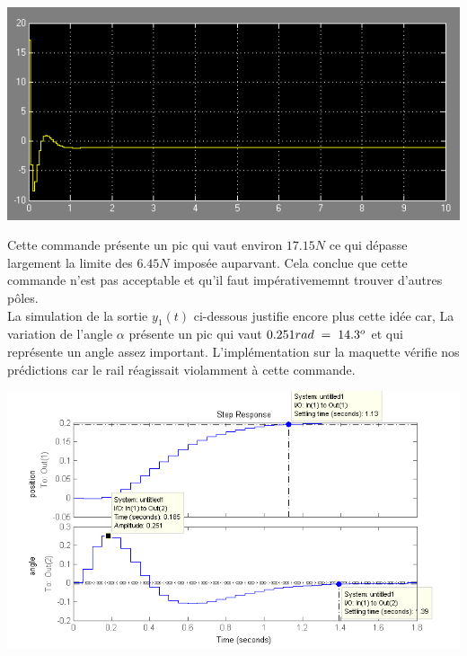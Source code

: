 	\begin{center}
	\includegraphics[scale=0.6]{newton1.png}
	\label{fig4} 
	\end{center}
	
Cette commande présente un pic qui vaut environ $17.15 N$ ce qui dépasse largement la limite des $6.45N$ imposée auparvant. Cela conclue que cette commande n'est pas acceptable et qu'il faut impérativememnt trouver d'autres pôles.\\

La simulation de la sortie $y_1(t)$ ci-dessous justifie encore plus cette idée car, La variation de l'angle $\alpha$  présente un pic qui vaut $0.251 rad \hspace{1mm} = \hspace{1mm} 14.3^{o}$ et qui représente un angle assez important. L'implémentation sur la maquette vérifie nos prédictions car le rail réagissait violamment à cette commande.       

	\begin{center}
	\includegraphics[scale=0.6]{step1.png}
	\label{fig5} 
	\end{center} 
	
